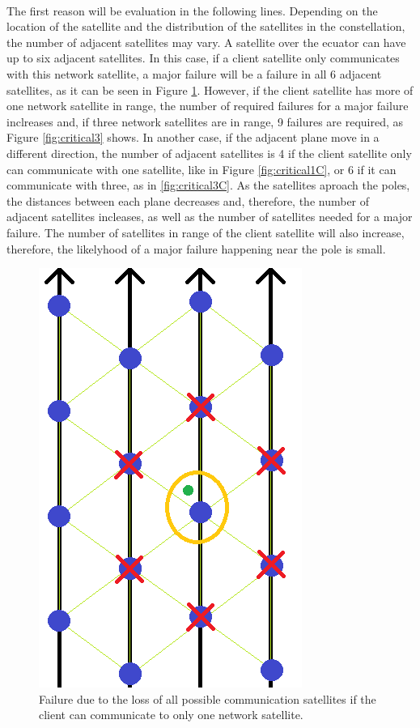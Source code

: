 \documentclass[12pt,a4paper]{report}
\begin{document}
\paragraph{}The first reason will be evaluation in the following lines. Depending on the location of the satellite and the distribution of the satellites in the constellation, the number of adjacent satellites may vary. A satellite over the ecuator can have up to six adjacent satellites. In this case, if a client satellite only communicates with this network satellite, a major failure will be a failure in all 6 adjacent satellites, as it can be seen in Figure \ref{fig:critical1}. However, if the client satellite has more of one network satellite in range, the number of required failures for a major failure inclreases and, if three network satellites are in range, 9 failures are required, as Figure \ref{fig:critical3} shows. In another case, if the adjacent plane move in a different direction, the number of adjacent satellites is 4 if the client satellite only can communicate with one satellite, like in Figure \ref{fig:critical1C}, or 6 if it can communicate with three, as in \ref{fig:critical3C}. As the satellites aproach the poles, the distances between each plane decreases and, therefore, the number of adjacent satellites incleases, as well as the number of satellites needed for a major failure. The number of satellites in range of the client satellite will also increase, therefore, the likelyhood of a major failure happening near the pole is small.
\begin{figure}[H]
\begin{center}
\includegraphics[scale=0.5]{critical1.PNG}
\caption[1 communication range failure]{Failure due to the loss of all possible communication satellites if the client can communicate to only one network satellite.}
\label{fig:critical1}
\end{center}
\end{figure}
\end{document}
